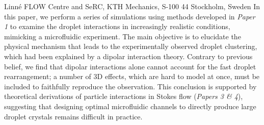 %
%
%
%
%
%
%
\paperaffiliation
{%
  Linn\'e FLOW Centre and SeRC, KTH Mechanics, S-100 44 Stockholm, Sweden%
}%
%
%
%
%
%
\papernumber{}%
%
%
%
%
%
\papersummary%
{%
In this paper, we perform a series of simulations using methods developed in \emph{Paper 1}
to examine the droplet interactions in increasingly realistic conditions, mimicking a microfluidic experiment.
The main objective is to elucidate the physical mechanism that leads to the experimentally observed droplet clustering,
which had been explained by a dipolar interaction theory.
Contrary to previous belief, we find that dipolar interactions alone cannot account for the fast droplet rearrangement;
a number of 3D effects, which are hard to model at once, must be included to faithfully reproduce the observation.
This conclusion is supported by theoretical derivations of particle interactions in Stokes flow (\emph{Papers 3 \& 4}),
suggesting that designing optimal microfluidic channels to directly produce large droplet crystals remains difficult in practice.
}%
%
\graphicspath{{paper2/}}%
%
%
%
